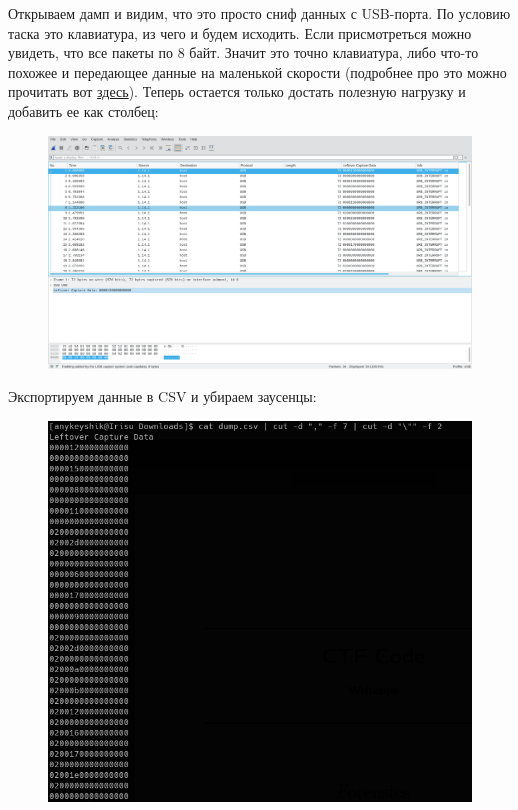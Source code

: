 \documentclass[idxtotoc,hyperref,openany,oneside]{files/forensics} %
\begin{document}
Открываем дамп и видим, что это просто сниф данных с USB-порта. По условию таска это клавиатура, из чего и будем исходить. Если присмотреться можно увидеть, что все пакеты по 8 байт. Значит это точно клавиатура, либо что-то похожее и передающее данные на маленькой скорости (подробнее про это можно прочитать вот \href{https://www.beyondlogic.org/usbnutshell/usb4.shtml}{здесь}). Теперь остается только достать полезную нагрузку и добавить ее как столбец:
\begin{figure}[H]
\begin{center}
\includegraphics[width=1.0\linewidth]{files/keyboard-payload}
\end{center}
\label{fig:keyboard-payload}
\end{figure}

Экспортируем данные в CSV и убираем заусенцы:
\begin{figure}[H]
\begin{center}
\includegraphics[width=1.0\linewidth]{files/keyboard-csv}
\end{center}
\label{fig:keyboard-csv}
\end{figure}
\end{document}
